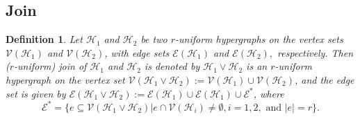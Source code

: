 \documentclass[10pt,a4paper]{article}
\newtheorem{definition}{Definition}[section]
\begin{document}
	\subsection{Join}
	
	\begin{definition}\cite{shetty2025forgotten}
		Let $\mathcal{H}_1$ and $\mathcal{H}_2$ be two $r$-uniform hypergraphs on the vertex sets $\mathcal{V}(\mathcal{H}_1)$ and $\mathcal{V}(\mathcal{H}_2)$, with edge sets $\mathcal{E}(\mathcal{H}_1)$ and $\mathcal{E}(\mathcal{H}_2),$ respectively. Then ($r$-uniform) join of $\mathcal{H}_1$ and $\mathcal{H}_2$ is denoted by $\mathcal{H}_1 \vee \mathcal{H}_2$ is an $r$-uniform hypergraph on the vertex set $\mathcal{V}(\mathcal{H}_1 \vee \mathcal{H}_2) := \mathcal{V}(\mathcal{H}_1) \cup \mathcal{V}(\mathcal{H}_2)$, and the edge set is given by $\mathcal{E}(\mathcal{H}_1 \vee \mathcal{H}_2):=\mathcal{E}(\mathcal{H}_1) \cup \mathcal{E}(\mathcal{H}_1) \cup \mathcal{E}^*$, where 
		$$\mathcal{E}^* = \{ e \subseteq \mathcal{V}(\mathcal{H}_1 \vee  \mathcal{H}_2) \vert e \cap  \mathcal{V}(\mathcal{H}_i) \neq \emptyset, i= 1,2, \text{ and } |e|=r \}.$$
	\end{definition}
	
\end{document}
